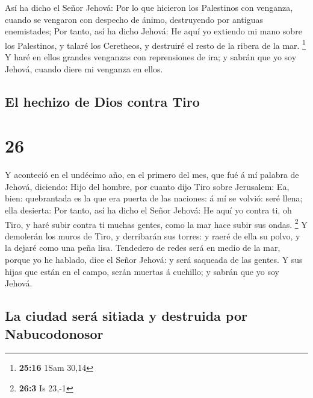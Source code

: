  Así ha dicho el Señor Jehová: Por lo que hicieron los
Palestinos con venganza, cuando se vengaron con despecho de ánimo,
destruyendo por antiguas enemistades;  Por tanto, así ha
dicho Jehová: He aquí yo extiendo mi mano sobre los Palestinos, y talaré
los Ceretheos, y destruiré el resto de la ribera de la mar. \footnote{\textbf{25:16}
  1Sam 30,14}  Y haré en ellos grandes venganzas con
reprensiones de ira; y sabrán que yo soy Jehová, cuando diere mi
venganza en ellos.

\hypertarget{el-hechizo-de-dios-contra-tiro}{%
\subsection{El hechizo de Dios contra
Tiro}\label{el-hechizo-de-dios-contra-tiro}}

\hypertarget{section-25}{%
\section{26}\label{section-25}}

 Y aconteció en el undécimo año, en el primero del mes, que
fué á mí palabra de Jehová, diciendo:  Hijo del hombre, por
cuanto dijo Tiro sobre Jerusalem: Ea, bien: quebrantada es la que era
puerta de las naciones: á mí se volvió: seré llena; ella desierta:
 Por tanto, así ha dicho el Señor Jehová: He aquí yo contra
ti, oh Tiro, y haré subir contra ti muchas gentes, como la mar hace
subir sus ondas. \footnote{\textbf{26:3} Is 23,-1}  Y
demolerán los muros de Tiro, y derribarán sus torres: y raeré de ella su
polvo, y la dejaré como una peña lisa.  Tendedero de redes
será en medio de la mar, porque yo he hablado, dice el Señor Jehová: y
será saqueada de las gentes.  Y sus hijas que están en el
campo, serán muertas á cuchillo; y sabrán que yo soy Jehová.

\hypertarget{la-ciudad-seruxe1-sitiada-y-destruida-por-nabucodonosor}{%
\subsection{La ciudad será sitiada y destruida por
Nabucodonosor}\label{la-ciudad-seruxe1-sitiada-y-destruida-por-nabucodonosor}}

